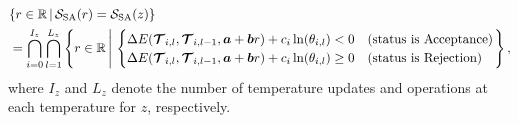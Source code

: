 \begin{align}
  &\{r \in \mathbb{R} \, | \, \mathcal{S}_{\text{SA}}(r) = \mathcal{S}_{\text{SA}}(z)\} \notag \\
  &= \bigcap_{i=0}^{I_z} \bigcap_{l=1}^{L_z} \left\{r \in \mathbb{R} \, \Bigg| \,
  \begin{cases}
    \Delta E(\bm{\mathcal{T}}_{i,l}, \bm{\mathcal{T}}_{i,l-1}, \bm{a} + \bm{b}r) + c_i \ln (\theta_{i,l}) < 0 & \text{(status is Acceptance)} \\
    \Delta E(\bm{\mathcal{T}}_{i,l}, \bm{\mathcal{T}}_{i,l-1}, \bm{a} + \bm{b}r) + c_i \ln (\theta_{i,l}) \geq 0 & \text{(status is Rejection)}
  \end{cases}
  \right\}, \label{sa_condition}
\end{align}
where $I_z$ and $L_z$ denote the number of temperature updates and operations at each temperature for $z$, respectively.

